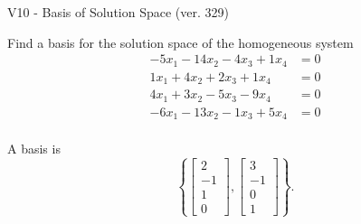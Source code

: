 \begin{exercise}
  \begin{exerciseTitle}V10 - Basis of Solution Space (ver. 329)\end{exerciseTitle}
  \begin{exerciseStatement}
    Find a basis for the solution space of the homogeneous system 
\begin{align*}
 -5 x_ 1 -14 x_ 2 -4 x_ 3 + 1 x_ 4 &= 0  \\ 
  1 x_ 1 + 4 x_ 2 + 2 x_ 3 + 1 x_ 4 &= 0  \\ 
  4 x_ 1 + 3 x_ 2 -5 x_ 3 -9 x_ 4 &= 0  \\ 
  -6 x_ 1 -13 x_ 2 -1 x_ 3 + 5 x_ 4 &= 0  \\ 
 \end{align*}


 
  \end{exerciseStatement}

  \begin{exerciseAnswer}
   A basis is   
\[\left\{\left[\begin{array}{c}
2 \\
-1 \\
1 \\
0
\end{array}\right] , \left[\begin{array}{c}
3 \\
-1 \\
0 \\
1
\end{array}\right]\right\}.\]

  


  \end{exerciseAnswer}
\end{exercise}